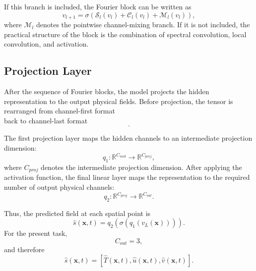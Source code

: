 If this branch is included, the Fourier block can be written as
\begin{equation}
v_{l+1}
=
\sigma
\left(
\mathcal{S}_l(v_l)
+
\mathcal{C}_l(v_l)
+
\mathcal{M}_l(v_l)
\right),
\end{equation}
where \(\mathcal{M}_l\) denotes the pointwise channel-mixing branch. If it is not included, the practical structure of the block is the combination of spectral convolution, local convolution, and activation.

\subsection{Projection Layer}

After the sequence of Fourier blocks, the model projects the hidden representation to the output physical fields. Before projection, the tensor is rearranged from channel-first format
\begin{equation}
[B, C_{mid}, N_x, N_y]
\end{equation}
back to channel-last format
\begin{equation}
[B, N_x, N_y, C_{mid}].
\end{equation}

The first projection layer maps the hidden channels to an intermediate projection dimension:
\begin{equation}
q_1:
\mathbb{R}^{C_{mid}}
\rightarrow
\mathbb{R}^{C_{proj}},
\end{equation}
where \(C_{proj}\) denotes the intermediate projection dimension. After applying the activation function, the final linear layer maps the representation to the required number of output physical channels:
\begin{equation}
q_2:
\mathbb{R}^{C_{proj}}
\rightarrow
\mathbb{R}^{C_{out}}.
\end{equation}

Thus, the predicted field at each spatial point is
\begin{equation}
\hat{s}(\boldsymbol{x}, t)
=
q_2
\left(
\sigma
\left(
q_1(v_L(\boldsymbol{x}))
\right)
\right).
\end{equation}
For the present task,
\begin{equation}
C_{out}=3,
\end{equation}
and therefore
\begin{equation}
\hat{s}(\boldsymbol{x}, t)
=
\left[
\hat{T}(\boldsymbol{x}, t),
\hat{u}(\boldsymbol{x}, t),
\hat{v}(\boldsymbol{x}, t)
\right].
\end{equation}

